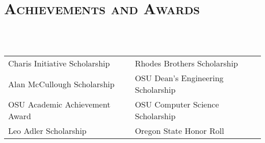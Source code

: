 \documentclass[letterpaper,10pt,titlepage]{article}
\begin{document}
\begin{comment} %
\begin{tabularx}{\linewidth}{Xr}
\textbf{\textit{Crossroads Carnegie Art Center}} & \textbf{Volunteer}\\
\textbf{Technical Support, Web Master}           & Summer 2013 -- Fall 2013, Current\\
Baker City, Oregon & \\
\end{tabularx}

\begin{itemize} \itemsep1pt \parskip0pt \parsep0pt
\item Created digital backups of previous years tax information
\item Transferred customer data to a new cloud database for the Center
\item Maintained custom PHP/XHTML website to specifications
\item Provided consultation on creation of requirements for a new website
\end{itemize}
\end{comment}


\section*{\textsc{Achievements and Awards}}
~\\
~\\
\begin{tabularx}{\linewidth}{>{\centering\arraybackslash}X|>{\centering\arraybackslash}X}
Charis Initiative Scholarship & Rhodes Brothers Scholarship \\
Alan McCullough Scholarship & OSU Dean's Engineering Scholarship \\
OSU Academic Achievement Award & OSU Computer Science Scholarship \\
Leo Adler Scholarship & Oregon State Honor Roll\\
\end{tabularx}
\end{document}
